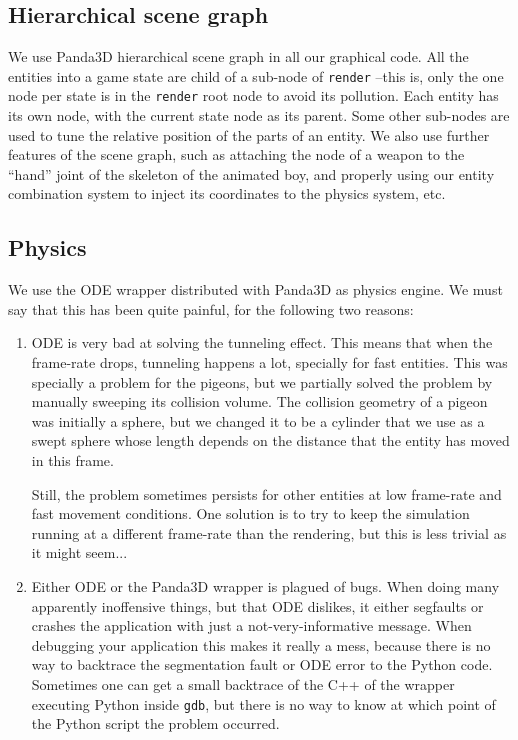 \documentclass[a4paper,10pt]{article}
\begin{document}
\subsection{Hierarchical scene graph}

We use Panda3D hierarchical scene graph in all our graphical code. All
the entities into a game state are child of a sub-node of
\texttt{render} --this is, only the one node per state is in the
\texttt{render} root node to avoid its pollution. Each entity has its
own node, with the current state node as its parent. Some other
sub-nodes are used to tune the relative position of the parts of an
entity. We also use further features of the scene graph, such as
attaching the node of a weapon to the ``hand'' joint of the skeleton
of the animated boy, and properly using our entity combination system
to inject its coordinates to the physics system, etc.

\subsection{Physics}

We use the ODE wrapper distributed with Panda3D as physics engine. We
must say that this has been quite painful, for the following two
reasons:

\begin{enumerate}
\item ODE is very bad at solving the tunneling effect. This means that
  when the frame-rate drops, tunneling happens a lot, specially for
  fast entities. This was specially a problem for the pigeons, but we
  partially solved the problem by manually sweeping its collision
  volume. The collision geometry of a pigeon was initially a sphere,
  but we changed it to be a cylinder that we use as a swept sphere
  whose length depends on the distance that the entity has moved in
  this frame.

  Still, the problem sometimes persists for other entities at low
  frame-rate and fast movement conditions. One solution is to try to
  keep the simulation running at a different frame-rate than the
  rendering, but this is less trivial as it might seem...

\item Either ODE or the Panda3D wrapper is plagued of bugs. When doing
  many apparently inoffensive things, but that ODE dislikes, it
  either segfaults or crashes the application with just a
  not-very-informative message. When debugging your application this
  makes it really a mess, because there is no way to backtrace the
  segmentation fault or ODE error to the Python code. Sometimes one
  can get a small backtrace of the C++ of the wrapper executing Python
  inside \texttt{gdb}, but there is no way to know at which point of
  the Python script the problem occurred.
\end{enumerate}
\end{document}
